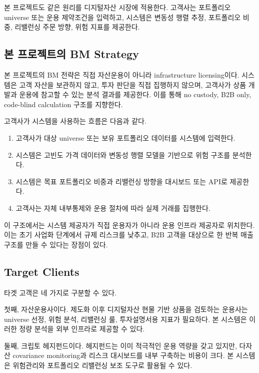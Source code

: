 \documentclass[12pt,a4paper]{article}
\begin{document}
본 프로젝트도 같은 원리를 디지털자산 시장에 적용한다. 고객사는 포트폴리오 universe 또는 운용 제약조건을 입력하고, 시스템은 변동성 행렬 추정, 포트폴리오 비중, 리밸런싱 주문 방향, 위험 지표를 제공한다.


\subsection{본 프로젝트의 BM Strategy}

본 프로젝트의 BM 전략은 직접 자산운용이 아니라 infrastructure licensing이다. 시스템은 고객 자산을 보관하지 않고, 투자 판단을 직접 집행하지 않으며, 고객사가 상품 개발과 운용에 참고할 수 있는 분석 결과를 제공한다. 이를 통해 no custody, B2B only, code-blind calculation 구조를 지향한다.

고객사가 시스템을 사용하는 흐름은 다음과 같다.

\begin{enumerate}
\item 고객사가 대상 universe 또는 보유 포트폴리오 데이터를 시스템에 입력한다.
\item 시스템은 고빈도 가격 데이터와 변동성 행렬 모델을 기반으로 위험 구조를 분석한다.
\item 시스템은 목표 포트폴리오 비중과 리밸런싱 방향을 대시보드 또는 API로 제공한다.
\item 고객사는 자체 내부통제와 운용 절차에 따라 실제 거래를 집행한다.
\end{enumerate}

이 구조에서는 시스템 제공자가 직접 운용자가 아니라 운용 인프라 제공자로 위치한다. 이는 초기 사업화 단계에서 규제 리스크를 낮추고, B2B 고객을 대상으로 한 반복 매출 구조를 만들 수 있다는 장점이 있다.

\subsection{Target Clients}

타겟 고객은 네 가지로 구분할 수 있다.

첫째, 자산운용사이다. 제도화 이후 디지털자산 현물 기반 상품을 검토하는 운용사는 universe 선정, 위험 분석, 리밸런싱 룰, 투자설명서용 지표가 필요하다. 본 시스템은 이러한 정량 분석을 외부 인프라로 제공할 수 있다.

둘째, 크립토 헤지펀드이다. 헤지펀드는 이미 적극적인 운용 역량을 갖고 있지만, 다자산 covariance monitoring과 리스크 대시보드를 내부 구축하는 비용이 크다. 본 시스템은 위험관리와 포트폴리오 리밸런싱 보조 도구로 활용될 수 있다.
\end{document}
